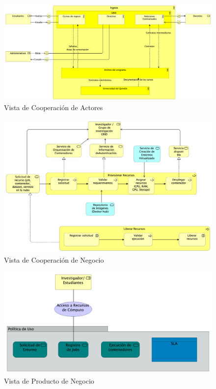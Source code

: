 \begin{figure}[H]
    \centering
    \includegraphics[width=\textwidth]{tablas-images/cp6/Actor-Cooperation-view.png}
    \caption{Vista de Cooperación de Actores}
\end{figure}
\begin{figure}[H]
    \centering
    \includegraphics[width=\textwidth]{tablas-images/cp6/Business-Cooperation-View.png}
    \caption{Vista de Cooperación de Negocio}
\end{figure}
\begin{figure}[H]
    \centering
    \includegraphics[width=\textwidth]{tablas-images/cp6/Business-Product-View.png}
    \caption{Vista de Producto de Negocio}
\end{figure}
